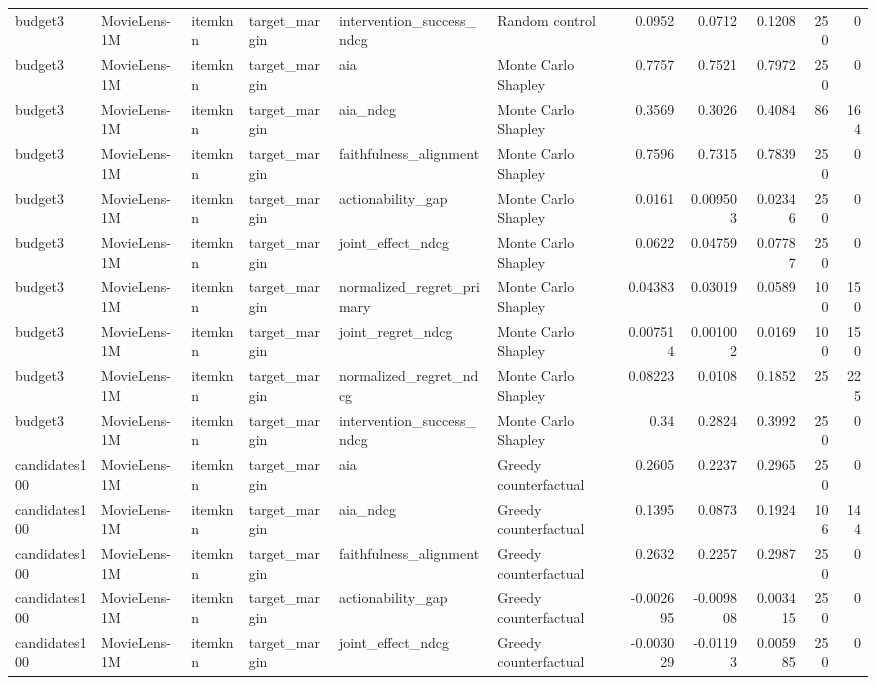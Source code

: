 \begin{table}[t]
{\begin{tabular}{llllllrrrrr}
budget3 & MovieLens-1M & itemknn & target\_margin & intervention\_success\_ndcg & Random control & 0.0952 & 0.0712 & 0.1208 & 250 & 0 \\
budget3 & MovieLens-1M & itemknn & target\_margin & aia & Monte Carlo Shapley & 0.7757 & 0.7521 & 0.7972 & 250 & 0 \\
budget3 & MovieLens-1M & itemknn & target\_margin & aia\_ndcg & Monte Carlo Shapley & 0.3569 & 0.3026 & 0.4084 & 86 & 164 \\
budget3 & MovieLens-1M & itemknn & target\_margin & faithfulness\_alignment & Monte Carlo Shapley & 0.7596 & 0.7315 & 0.7839 & 250 & 0 \\
budget3 & MovieLens-1M & itemknn & target\_margin & actionability\_gap & Monte Carlo Shapley & 0.0161 & 0.009503 & 0.02346 & 250 & 0 \\
budget3 & MovieLens-1M & itemknn & target\_margin & joint\_effect\_ndcg & Monte Carlo Shapley & 0.0622 & 0.04759 & 0.07787 & 250 & 0 \\
budget3 & MovieLens-1M & itemknn & target\_margin & normalized\_regret\_primary & Monte Carlo Shapley & 0.04383 & 0.03019 & 0.0589 & 100 & 150 \\
budget3 & MovieLens-1M & itemknn & target\_margin & joint\_regret\_ndcg & Monte Carlo Shapley & 0.007514 & 0.001002 & 0.0169 & 100 & 150 \\
budget3 & MovieLens-1M & itemknn & target\_margin & normalized\_regret\_ndcg & Monte Carlo Shapley & 0.08223 & 0.0108 & 0.1852 & 25 & 225 \\
budget3 & MovieLens-1M & itemknn & target\_margin & intervention\_success\_ndcg & Monte Carlo Shapley & 0.34 & 0.2824 & 0.3992 & 250 & 0 \\
candidates100 & MovieLens-1M & itemknn & target\_margin & aia & Greedy counterfactual & 0.2605 & 0.2237 & 0.2965 & 250 & 0 \\
candidates100 & MovieLens-1M & itemknn & target\_margin & aia\_ndcg & Greedy counterfactual & 0.1395 & 0.0873 & 0.1924 & 106 & 144 \\
candidates100 & MovieLens-1M & itemknn & target\_margin & faithfulness\_alignment & Greedy counterfactual & 0.2632 & 0.2257 & 0.2987 & 250 & 0 \\
candidates100 & MovieLens-1M & itemknn & target\_margin & actionability\_gap & Greedy counterfactual & -0.002695 & -0.009808 & 0.003415 & 250 & 0 \\
candidates100 & MovieLens-1M & itemknn & target\_margin & joint\_effect\_ndcg & Greedy counterfactual & -0.003029 & -0.01193 & 0.005985 & 250 & 0 \\

\end{tabular}}
\end{table}
